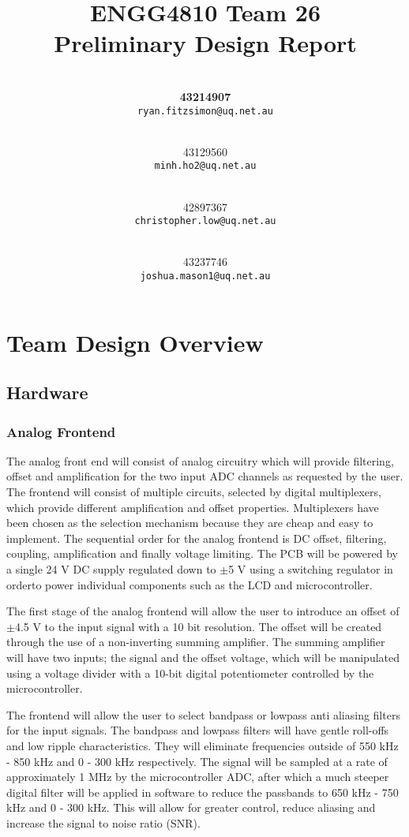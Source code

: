 \documentclass[12pt]{report}
\title{\vspace{-2cm}ENGG4810 Team 26\\
	Preliminary Design Report\vspace{1cm}}
\author{
	\makebox[.4\linewidth]{\textbf{Ryan Fitzimon}}\\
	\textbf{43214907}\\
	\texttt{ryan.fitzsimon@uq.net.au}
	\and
	\makebox[.4\linewidth]{Minh Toan Ho}\\
	43129560\\
	\texttt{minh.ho2@uq.net.au}
	\and
	\makebox[.4\linewidth]{Christopher Low}\\
	42897367\\
	\texttt{christopher.low@uq.net.au}
	\and
	\makebox[.4\linewidth]{Joshua Mason}\\
	43237746\\
	\texttt{joshua.mason1@uq.net.au}
	\vspace{1cm}
}
\begin{document}
\maketitle

\chapter{Team Design Overview}
\section{Hardware}
\subsection{Analog Frontend}
The analog front end will consist of analog circuitry which will provide filtering, offset and amplification for the two input ADC channels as requested by the user. The frontend will consist of multiple circuits, selected by digital multiplexers, which provide different amplification and offset properties. Multiplexers have been chosen as the selection mechanism because they are cheap and easy to implement. The sequential order for the analog frontend is DC offset, filtering, coupling, amplification and finally voltage limiting. The PCB will be powered by a single 24 V DC supply regulated down to $\pm$5 V using a switching regulator in orderto power individual components such as the LCD and microcontroller.

The first stage of the analog frontend will allow the user to introduce an offset of $\pm$4.5 V to the input signal with a 10 bit resolution. The offset will be created through the use of a non-inverting summing amplifier. The summing amplifier will have two inputs; the signal and the offset voltage, which will be manipulated using a voltage divider with a 10-bit digital potentiometer controlled by the microcontroller.

The frontend will allow the user to select bandpass or lowpass anti aliasing filters for the input signals. The bandpass and lowpass filters will have gentle roll-offs and low ripple characteristics. They will eliminate frequencies outside of 550 kHz - 850 kHz and 0 - 300 kHz respectively. The signal will be sampled at a rate of approximately 1 MHz by the microcontroller ADC, after which a much steeper digital filter will be applied in software to reduce the passbands to 650 kHz - 750 kHz and 0 - 300 kHz. This will allow for greater control, reduce aliasing and increase the signal to noise ratio (SNR).
\end{document}
